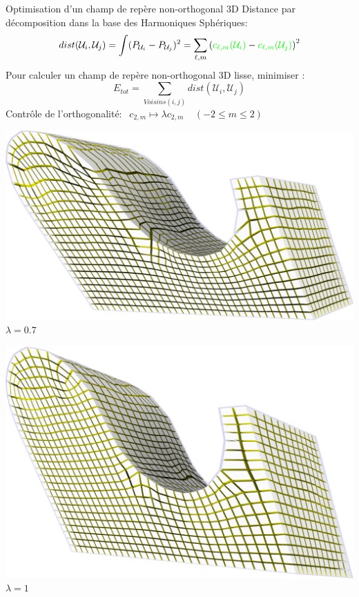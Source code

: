 \begin{frame}{Optimisation d'un champ de repère non-orthogonal 3D}
    \centering
    \footnotesize
    Distance par décomposition dans la base des Harmoniques Sphériques:
    $$ dist(\mathcal{U}_i, \mathcal{U}_j) = \int (P_{\mathcal{U}_i} - P_{\mathcal{U}_j})^2 = \sum_{\ell, m} \left({\color{green}c_{\ell,m}(\mathcal{U}_i)} - {\color{green}c_{\ell,m}(\mathcal{U}_j)} \right)^2$$
    Pour calculer un champ de repère non-orthogonal 3D lisse, minimiser :
    $$ E_{tot} = \sum_{Voisins(i, j)} dist(\mathcal{U}_i, \mathcal{U}_j)$$
    Contrôle de l'orthogonalité: $\ \ c_{2,m} \mapsto \lambda c_{2,m} \ \ \ \ \ (-2 \leq m \leq 2)$ %
    
    \begin{minipage}[b]{0.33\textwidth}
        \centering
        \includegraphics[width=\textwidth]{img_spm_ff/shear_0_7.png}
        $\lambda = 0.7$
    \end{minipage}
    \begin{minipage}[b]{0.28\textwidth}
        \centering
        \includegraphics[width=\textwidth]{img_spm_ff/shear_1.png}
        $\lambda = 1$
    \end{minipage}
    
    \normalsize
\end{frame} 

